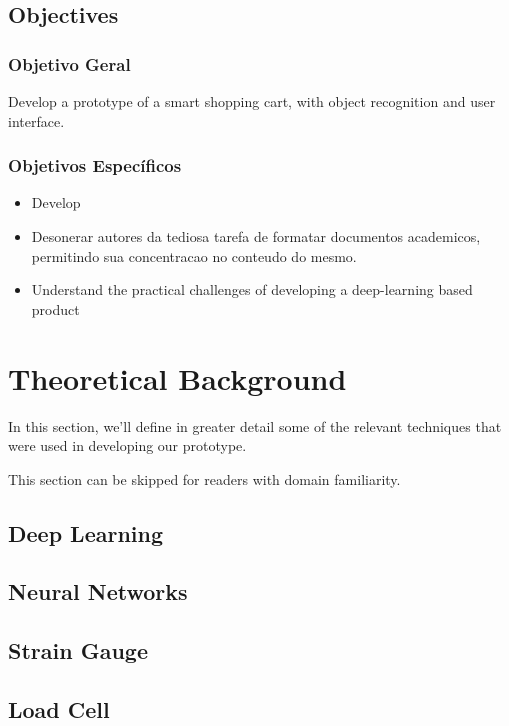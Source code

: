 \documentclass[openright]{normas-utf-tex} %
\begin{document}
\section{Objectives}

\subsection{Objetivo Geral}

Develop a prototype of a smart shopping cart, with object recognition and
user interface.

\subsection{Objetivos Específicos}

\begin{itemize}
	\item Develop
	\item Desonerar autores da tediosa tarefa de formatar documentos academicos, permitindo sua concentracao no conteudo do mesmo.
	\item Understand the practical challenges of developing a deep-learning based product
\end{itemize}

\chapter{Theoretical Background}

In this section, we'll define in greater detail some of the relevant techniques
that were used in developing our prototype.

This section can be skipped for readers with domain familiarity.

\section{Deep Learning}

\section{Neural Networks}

\section{Strain Gauge}

\section{Load Cell}
\end{document}
